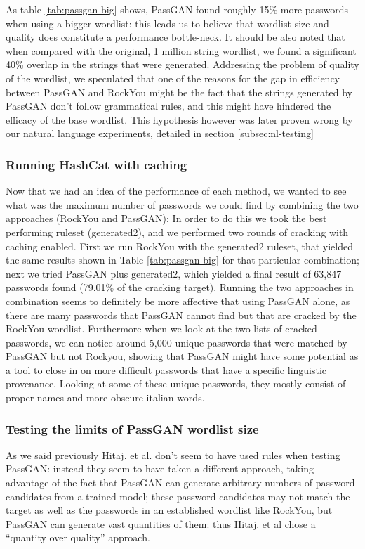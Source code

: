 As table \ref{tab:passgan-big} shows, PassGAN found roughly 15\% more passwords when using a bigger wordlist: this leads us to believe that wordlist size and quality does constitute a performance bottle-neck. It should be also noted that when compared with the original, 1 million string wordlist, we found a significant 40\% overlap in the strings that were generated. Addressing the problem of quality of the wordlist, we speculated that one of the reasons for the gap in efficiency between PassGAN and RockYou might be the fact that the strings generated by PassGAN don't follow grammatical rules, and this might have hindered the efficacy of the base wordlist. This hypothesis however was later proven wrong by our natural language experiments, detailed in section \ref{subsec:nl-testing}

\subsubsection{Running HashCat with caching}\label{subsubsec:potfile-enable}
Now that we had an idea of the performance of each method, we wanted to see what was the maximum number of passwords we could find by combining the two approaches (RockYou and PassGAN):
In order to do this we took the best performing ruleset (generated2), and we performed two rounds of cracking with caching enabled. First we run RockYou with the generated2 ruleset, that yielded the same results shown in Table \ref{tab:passgan-big} for that particular combination; next we tried PassGAN plus generated2, which yielded a final result of 63,847 passwords found (79.01\% of the cracking target). Running the two approaches in combination seems to definitely be more affective that using PassGAN alone, as there are many passwords that PassGAN cannot find but that are cracked by the RockYou wordlist.
Furthermore when we look at the two lists of cracked passwords, we can notice around 5,000 unique passwords that were matched by PassGAN but not Rockyou, showing that PassGAN might have some potential as a tool to close in on more difficult passwords that have a specific linguistic provenance. Looking at some of these unique passwords, they mostly consist of proper names and more obscure italian words.

\subsubsection{Testing the limits of PassGAN wordlist size}\label{subsubsec:huge-wordlists}
As we said previously Hitaj. et al. \cite{PassGAN} don't seem to have used rules when testing PassGAN: instead they seem to have taken a different approach, taking advantage of the fact that PassGAN can generate arbitrary numbers of password candidates from a trained model; these password candidates may not match the target as well as the passwords in an established wordlist like RockYou, but PassGAN can generate vast quantities of them: thus Hitaj. et al chose a \enquote{quantity over quality} approach.

